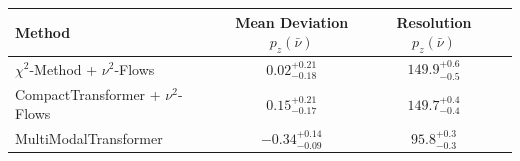     \begin{tabular}{lccc}
        \toprule
        Method & Mean Deviation $p_{z}(\bar{\nu})$ & Resolution $p_{z}(\bar{\nu})$ \\
        \midrule
        $\chi^2$-Method + $\nu^2$-Flows & $0.02^{+0.21}_{-0.18}$ & $149.9^{+0.6}_{-0.5}$ \\
        CompactTransformer + $\nu^2$-Flows & $0.15^{+0.21}_{-0.17}$ & $149.7^{+0.4}_{-0.4}$ \\
        MultiModalTransformer & $-0.34^{+0.14}_{-0.09}$ & $95.8^{+0.3}_{-0.3}$ \\
        \bottomrule
    \end{tabular}